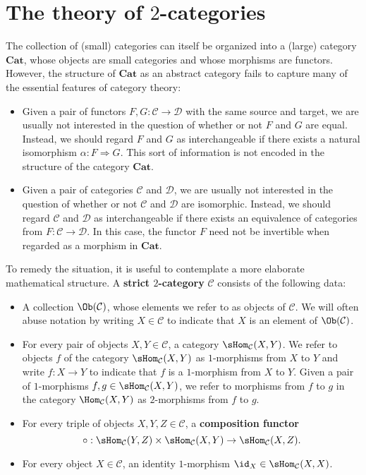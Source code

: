 \section{The theory of \texorpdfstring{$2$}{2}-categories}
The collection of (small) categories can itself be organized into a (large) category $\mathbf{Cat}$, whose objects are small categories and whose morphisms are functors. However, the structure of $\mathbf{Cat}$ as an abstract category fails to capture many of the essential features of category theory:
\begin{itemize}
\item Given a pair of functors $F,G:\mathcal{C}\to\mathcal{D}$ with the same source and target, we are usually not interested in the question of whether or not $F$ and $G$ are equal. Instead, we should regard $F$ and $G$ as interchangeable if there exists a natural isomorphism $\alpha:F\Rightarrow G$. This sort of information is not encoded in the structure of the category $\mathbf{Cat}$.
\item Given a pair of categories $\mathcal{C}$ and $\mathcal{D}$, we are usually not interested in the question of whether or not $\mathcal{C}$ and $\mathcal{D}$ are isomorphic. Instead, we should regard $\mathcal{C}$ and $\mathcal{D}$ as interchangeable if there exists an equivalence of categories from $F:\mathcal{C}\to\mathcal{D}$. In this case, the functor $F$ need not be invertible when regarded as a morphism in $\mathbf{Cat}$.
\end{itemize}
To remedy the situation, it is useful to contemplate a more elaborate mathematical structure. A \textbf{strict $2$-category} $\mathcal{C}$ consists of the following data:
\begin{itemize}
\item A collection $\Ob(\mathcal{C})$, whose elements we refer to as objects of $\mathcal{C}$. We will often abuse notation by writing $X\in\mathcal{C}$ to indicate that $X$ is an element of $\Ob(\mathcal{C})$.
\item For every pair of objects $X,Y\in\mathcal{C}$, a category $\sHom_{\mathcal{C}}(X,Y)$. We refer to objects $f$ of the category $\sHom_{\mathcal{C}}(X,Y)$ as $1$-morphisms from $X$ to $Y$ and write $f:X\to Y$ to indicate that $f$ is a $1$-morphism from $X$ to $Y$. Given a pair of $1$-morphisms $f,g\in\sHom_{\mathcal{C}}(X,Y)$, we refer to morphisms from $f$ to $g$ in the category $\Hom_{\mathcal{C}}(X,Y)$ as $2$-morphisms from $f$ to $g$.
\item For every triple of objects $X,Y,Z\in\mathcal{C}$, a \textbf{composition functor}
\[\circ:\sHom_{\mathcal{C}}(Y,Z)\times\sHom_{\mathcal{C}}(X,Y)\to\sHom_{\mathcal{C}}(X,Z).\]
\item For every object $X\in\mathcal{C}$, an identity $1$-morphism $\id_X\in\sHom_{\mathcal{C}}(X,X)$.
\end{itemize}
